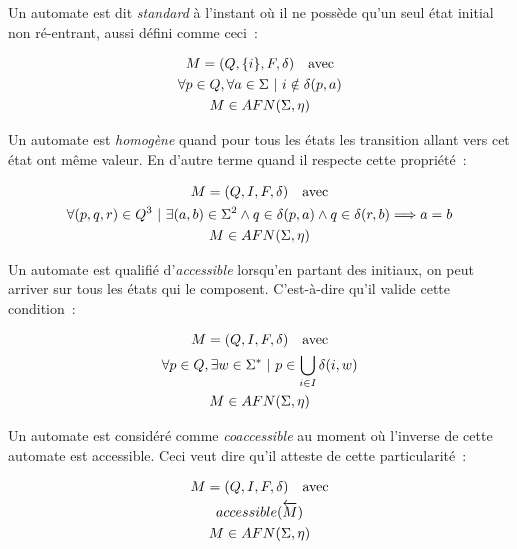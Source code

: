 \vphantom{}

\begin{definition}
    Un automate est dit \textit{standard} à l'instant où il ne possède qu'un seul
    état initial non ré-entrant, aussi défini comme ceci~:

    \begin{gather*}
        M = (Q, \{i\}, F, \delta) \quad \text{avec} \\
        \forall p \in Q, \forall a \in \Sigma ~|~ i \notin \delta(p, a) \notag \\
        M \in AFN(\Sigma, \eta) \notag
    \end{gather*}
\end{definition}

\begin{definition}
    Un automate est \textit{homogène} quand pour tous les états les transition
    allant vers cet état ont même valeur. En d'autre terme quand il respecte cette
    propriété~:

    \begin{gather*}
        M = (Q, I, F, \delta) \quad \text{avec} \\
        \forall (p, q, r) \in Q^3 ~|~ \exists (a, b) \in \Sigma^2 \land q \in \delta(p, a) \land q \in \delta(r, b) \Longrightarrow a = b \notag \\
        M \in AFN(\Sigma, \eta) \notag
    \end{gather*}
\end{definition}

\begin{definition}
    Un automate est qualifié d'\textit{accessible} lorsqu'en partant des initiaux,
    on peut arriver sur tous les états qui le composent. C'est-à-dire qu'il valide
    cette condition~:

    \begin{gather*}
        M = (Q, I, F, \delta) \quad \text{avec} \\
        \forall p \in Q, \exists w \in \Sigma^* ~|~ p \in \bigcup_{i \in I} \delta(i, w) \notag \\
        M \in AFN(\Sigma, \eta) \notag
    \end{gather*}
\end{definition}

\begin{lemma}
    Un automate est considéré comme \textit{coaccessible} au moment où l'inverse de
    cette automate est accessible. Ceci veut dire qu'il atteste de cette
    particularité~:

    \begin{gather*}
        M = (Q, I, F, \delta) \quad \text{avec} \\
        accessible(\overleftarrow{M}) \notag \\
        M \in AFN(\Sigma, \eta) \notag
    \end{gather*}
\end{lemma}

